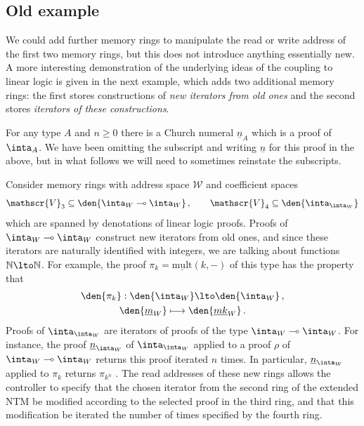 \subsection{Old example}

We could add further memory rings to manipulate the read or write address of the first two memory rings, but this does not introduce anything essentially new. A more interesting demonstration of the underlying ideas of the coupling to linear logic is given in the next example, which adds two additional memory rings: the first stores constructions of \emph{new iterators from old ones} and the second stores \emph{iterators of these constructions}.

For any type $A$ and $n \ge 0$ there is a Church numeral $\underline{n}_A$ which is a proof of $\inta_A$. We have been omitting the subscript and writing $\underline{n}$ for this proof in the above, but in what follows we will need to sometimes reinstate the subscripts.

Consider memory rings with address space $\mathscr{W}$ and coefficient spaces
\[
\mathscr{V}_3 \subseteq \den{ \inta_{W} \multimap \inta_W }\,, \qquad \mathscr{V}_4 \subseteq \den{ \inta_{\inta_W} }
\]
which are spanned by denotations of linear logic proofs. Proofs of $\inta_W \multimap \inta_W$ construct new iterators from old ones, and since these iterators are naturally identified with integers, we are talking about functions $\mathbb{N} \lto \mathbb{N}$. For example, the proof $\pi_k = \underline{\mathrm{mult}}(k,-)$ of this type \cite[\S 6.1]{murfet_ll} has the property that
\begin{gather*}
\den{\pi_k}: \den{\inta_W} \lto \den{\inta_W}\,,\\
\den{\underline{m}_W} \longmapsto \den{\underline{mk}_W}\,.
\end{gather*}
Proofs of $\inta_{\inta_W}$ are iterators of proofs of the type $\inta_W \multimap \inta_W$. For instance, the proof $\underline{n}_{\inta_W}$ of $\inta_{\inta_W}$ applied to a proof $\rho$ of $\inta_W \multimap \inta_W$ returns this proof iterated $n$ times. In particular, $\underline{n}_{\inta_W}$ applied to $\pi_k$ returns $\pi_{k^n}$ \cite[Example 7.4]{murfet_ll}. The read addresses of these new rings allows the controller to specify that the chosen iterator from the second ring of the extended NTM be modified according to the selected proof in the third ring, and that this modification be iterated the number of times specified by the fourth ring.

